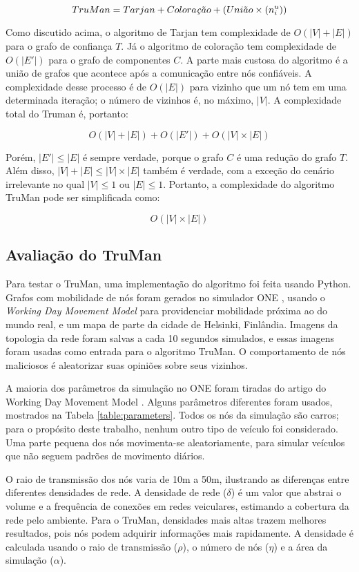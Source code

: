 \begin{resumoextendido}
	$$ TruMan = Tarjan + Colora\text{\textit{\c{c}}}\tilde ao + (Uni\tilde ao\times(n^u_i)) $$
	
	Como discutido acima, o algoritmo de Tarjan tem complexidade de $O(|V|+|E|)$ para o grafo de confiança $T$.
	Já o algoritmo de coloração tem complexidade de $O(|E'|)$ para o grafo de componentes $C$.
	A parte mais custosa do algoritmo é a união de grafos que acontece após a comunicação entre nós confiáveis.
	A complexidade desse processo é de $O(|E|)$ para vizinho que um nó tem em uma determinada iteração; o número de vizinhos é, no máximo, $|V|$.
	A complexidade total do Truman é, portanto:
	
	$$ O(|V|+|E|) + O(|E'|) + O(|V|\times |E|)$$
	
	Porém, $|E'| \leq |E|$ é sempre verdade, porque o grafo $C$ é uma redução do grafo $T$.
	Além disso, $|V|+|E| \leq |V|\times |E|$ também é verdade, com a exceção do cenário irrelevante no qual $|V| \leq 1$ ou $|E| \leq 1$.
	Portanto, a complexidade do algoritmo TruMan pode ser simplificada como:
	
	$$O(|V| \times |E|)$$
	
	\subsection*{Avaliação do TruMan}
	
	Para testar o TruMan, uma implementação do algoritmo foi feita usando Python.
	Grafos com mobilidade de nós foram gerados no simulador ONE \citep{keranen2009one}, usando o \textit{Working Day Movement Model} \citep{ekman2008working} para providenciar mobilidade próxima ao do mundo real, e um mapa de parte da cidade de Helsinki, Finlândia.
	Imagens da topologia da rede foram salvas a cada 10 segundos simulados, e essas imagens foram usadas como entrada para o algoritmo TruMan.
	O comportamento de nós maliciosos é aleatorizar suas opiniões sobre seus vizinhos.
	
	A maioria dos parâmetros da simulação no ONE foram tiradas do artigo do Working Day Movement Model \citep{ekman2008working}.
	Alguns parâmetros diferentes foram usados, mostrados na Tabela \ref{table:parameters}.
	Todos os nós da simulação são carros; para o propósito deste trabalho, nenhum outro tipo de veículo foi considerado.
	Uma parte pequena dos nós movimenta-se aleatoriamente, para simular veículos que não seguem padrões de movimento diários.
	
	O raio de transmissão dos nós varia de 10m a 50m, ilustrando as diferenças entre diferentes densidades de rede.
	A densidade de rede ($\delta$) é um valor que abstrai o volume e a frequência de conexões em redes veiculares, estimando a cobertura da rede pelo ambiente.
	Para o TruMan, densidades mais altas trazem melhores resultados, pois nós podem adquirir informações mais rapidamente.
	A densidade é calculada usando o raio de transmissão ($\rho$), o número de nós ($\eta$) e a área da simulação ($\alpha$).
	

\end{resumoextendido}
